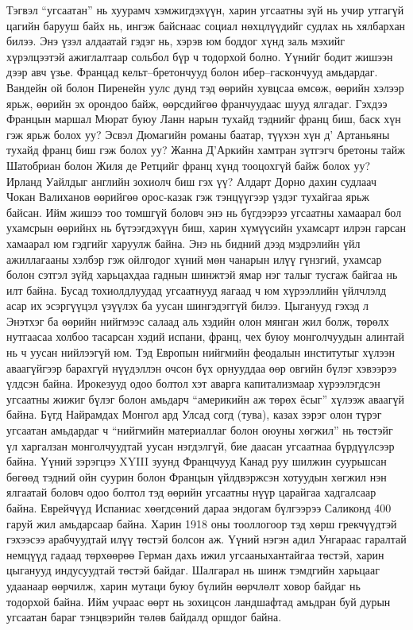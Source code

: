 Тэгвэл “угсаатан” нь хуурамч хэмжигдэхүүн, харин угсаатны зүй нь учир утгагүй цагийн барууш байх нь, ингэж байснаас социал нөхцлүүдийг судлах нь хялбархан билээ. Энэ үзэл алдаатай гэдэг нь, хэрэв юм боддог хүнд заль мэхийг хүрэлцээтэй ажиглалтаар сольбол бүр ч тодорхой болно. Үүнийг бодит жишээн дээр авч үзье. Францад кельт–бретончууд болон ибер–гаскончууд амьдардаг. Вандейн ой болон Пиренейн уулс дунд тэд өөрийн хувцсаа өмсөж, өөрийн хэлээр ярьж, өөрийн эх орондоо байж, өөрсдийгөө франчуудаас шууд ялгадаг. Гэхдээ Францын маршал Мюрат буюу Ланн нарын тухайд тэднийг франц биш, баск хүн гэж ярьж болох уу? Эсвэл Дюмагийн романы баатар, түүхэн хүн д’ Артаньяны тухайд франц биш гэж болох уу? Жанна Д’Аркийн хамтран зүтгэгч бретоны тайж Шатобриан болон Жиля де Ретцийг франц хүнд тооцохгүй байж болох уу? Ирланд Уайлдыг английн зохиолч биш гэх үү? Алдарт Дорно дахин судлаач Чокан Валиханов өөрийгөө орос-казак гэж тэнцүүгээр үздэг тухайгаа ярьж байсан. Ийм жишээ тоо томшгүй боловч энэ нь бүгдээрээ угсаатны хамаарал бол ухамсрын өөрийнх нь бүтээгдэхүүн биш, харин хүмүүсийн ухамсарт илрэн гарсан хамаарал юм гэдгийг харуулж байна. Энэ нь бидний дээд мэдрэлийн үйл ажиллагааны хэлбэр гэж ойлгодог хүний мөн чанарын илүү гүнзгий, ухамсар болон сэтгэл зүйд харьцахдаа гаднын шинжтэй ямар нэг талыг тусгаж байгаа нь илт байна. Бусад тохиолдлуудад угсаатнууд яагаад ч юм хүрээллийн үйлчлэлд асар их эсэргүүцэл үзүүлэх ба уусан шингэдэггүй билээ.
Цыганууд гэхэд л Энэтхэг ба өөрийн нийгмээс салаад аль хэдийн олон мянган жил болж, төрөлх нутгаасаа холбоо тасарсан хэдий испани, франц, чех буюу монголчуудын алинтай нь ч уусан нийлээгүй юм. Тэд Европын нийгмийн феодалын институтыг хүлээн аваагүйгээр барахгүй нүүдэллэн очсон бүх орнууддаа өөр овгийн бүлэг хэвээрээ үлдсэн байна. Ирокезууд одоо болтол хэт аварга капитализмаар хүрээлэгдсэн угсаатны жижиг бүлэг болон амьдарч “америкийн аж төрөх ёсыг” хүлээж аваагүй байна. Бүгд Найрамдах Монгол ард Улсад согд (тува), казах зэрэг олон түрэг угсаатан амьдардаг ч “нийгмийн материаллаг болон оюуны хөгжил” нь төстэйг үл харгалзан монголчуудтай уусан нэгдэлгүй, бие даасан угсаатнаа бүрдүүлсээр байна. Үүний зэрэгцээ XYIII зуунд Францчууд Канад руу шилжин суурьшсан бөгөөд тэдний ойн суурин болон Францын үйлдвэржсэн хотуудын хөгжил нэн ялгаатай боловч одоо болтол тэд өөрийн угсаатны нүүр царайгаа хадгалсаар байна. Еврейчүүд Испаниас хөөгдсөний дараа эндогам бүлгээрээ Саликонд 400 гаруй жил амьдарсаар байна. Харин 1918 оны тооллогоор тэд хөрш грекчүүдтэй гэхээсээ арабчуудтай илүү төстэй болсон аж. Үүний нэгэн адил Унгараас гаралтай немцүүд гадаад төрхөөрөө Герман дахь ижил угсааныхантайгаа төстэй, харин цыганууд индусуудтай төстэй байдаг. Шалгарал нь шинж тэмдгийн харьцааг удаанаар өөрчилж, харин мутаци буюу бүлийн өөрчлөлт ховор байдаг нь тодорхой байна. Ийм учраас өөрт нь зохицсон ландшафтад амьдран буй дурын угсаатан бараг тэнцвэрийн төлөв байдалд оршдог байна.
